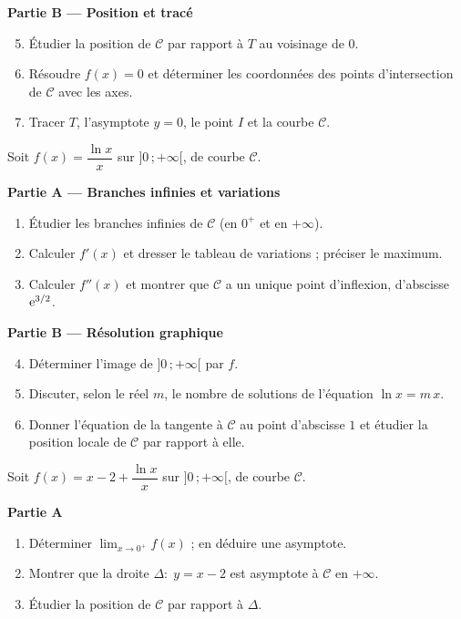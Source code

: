\textbf{Partie B — Position et tracé}
\begin{enumerate}
	\setcounter{enumi}{4}
	\item Étudier la position de $\mathcal C$ par rapport à $T$ au voisinage
	de $0$.
	\item Résoudre $f(x)=0$ et déterminer les coordonnées des points
	d'intersection de $\mathcal C$ avec les axes.
	\item Tracer $T$, l'asymptote $y=0$, le point $I$ et la courbe
	$\mathcal C$.
\end{enumerate}

Soit $f(x)=\dfrac{\ln x}{x}$ sur $]0\,;+\infty[$, de courbe $\mathcal C$.

\textbf{Partie A — Branches infinies et variations}
\begin{enumerate}
	\item Étudier les branches infinies de $\mathcal C$ (en $0^{+}$ et en
	$+\infty$).
	\item Calculer $f'(x)$ et dresser le tableau de variations ; préciser le
	maximum.
	\item Calculer $f''(x)$ et montrer que $\mathcal C$ a un unique point
	d'inflexion, d'abscisse $\mathrm{e}^{3/2}$.
\end{enumerate}

\textbf{Partie B — Résolution graphique}
\begin{enumerate}
	\setcounter{enumi}{3}
	\item Déterminer l'image de $]0\,;+\infty[$ par $f$.
	\item Discuter, selon le réel $m$, le nombre de solutions de l'équation
	$\ln x=m\,x$.
	\item Donner l'équation de la tangente à $\mathcal C$ au point d'abscisse
	$1$ et étudier la position locale de $\mathcal C$ par rapport à elle.
\end{enumerate}

Soit $f(x)=x-2+\dfrac{\ln x}{x}$ sur $]0\,;+\infty[$, de courbe $\mathcal C$.

\textbf{Partie A}
\begin{enumerate}
	\item Déterminer $\displaystyle\lim_{x\to 0^{+}}f(x)$ ; en déduire une
	asymptote.
	\item Montrer que la droite $\Delta:\;y=x-2$ est asymptote à $\mathcal C$
	en $+\infty$.
	\item Étudier la position de $\mathcal C$ par rapport à $\Delta$.
\end{enumerate}

